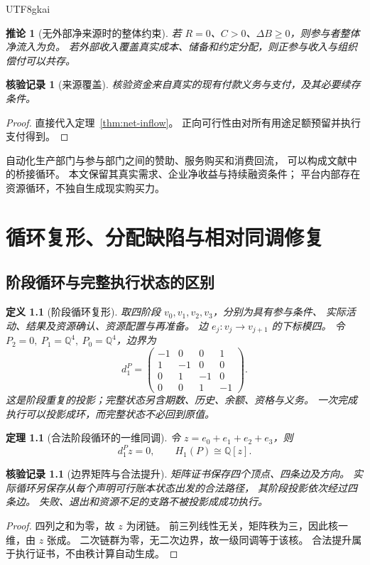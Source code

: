 \documentclass[12pt,a4paper,openany]{report}
\newtheorem{definition}{定义}[chapter]
\newtheorem{theorem}{定理}[chapter]
\newtheorem{corollary}{推论}[chapter]
\newtheorem{Certificate}{核验记录}[chapter]
\newcommand{\QQ}{\mathbb Q}
\begin{document}
\begin{CJK*}{UTF8}{gkai}
\begin{corollary}[无外部净来源时的整体约束]
若 \(R=0\)、\(C>0\)、\(\Delta B\ge0\)，则参与者整体净流入为负。
若外部收入覆盖真实成本、储备和约定分配，则正参与收入与组织偿付可以共存。
\end{corollary}
\begin{Certificate}[来源覆盖]
核验资金来自真实的现有付款义务与支付，及其必要续存条件。
\end{Certificate}
\begin{proof}
直接代入定理~\ref{thm:net-inflow}。
正向可行性由对所有用途足额预留并执行支付得到。
\end{proof}

自动化生产部门与参与部门之间的赞助、服务购买和消费回流，
可以构成文献\cite{EMarket}中的桥接循环。
本文保留其真实需求、企业净收益与持续融资条件；
平台内部存在资源循环，不独自生成现实购买力。

\chapter{循环复形、分配缺陷与相对同调修复}
\label{ch:homology}

\section{阶段循环与完整执行状态的区别}
\begin{definition}[阶段循环复形]
\label{def:phase}
取四阶段 \(v_0,v_1,v_2,v_3\)，分别为具有参与条件、
实际活动、结果及资源确认、资源配置与再准备。
边 \(e_j:v_j\to v_{j+1}\) 的下标模四。
令 \(P_2=0,\ P_1=\QQ^4,\ P_0=\QQ^4\)，边界为
\[
d_1^P=
\begin{pmatrix}
-1&0&0&1\\
1&-1&0&0\\
0&1&-1&0\\
0&0&1&-1
\end{pmatrix}.
\]
这是阶段重复的投影；完整状态另含期数、历史、余额、资格与义务。
一次完成执行可以投影成环，而完整状态不必回到原值。
\end{definition}

\begin{theorem}[合法阶段循环的一维同调]
\label{thm:cycle}
令 \(z=e_0+e_1+e_2+e_3\)，则
\[
d_1^Pz=0,\qquad H_1(P)\cong\QQ[z].
\]
\end{theorem}
\begin{Certificate}[边界矩阵与合法提升]
矩阵证书保存四个顶点、四条边及方向。
实际循环另保存从每个声明可行账本状态出发的合法路径，
其阶段投影依次经过四条边。
失败、退出和资源不足的支路不被投影成成功执行。
\end{Certificate}
\begin{proof}
四列之和为零，故 \(z\) 为闭链。
前三列线性无关，矩阵秩为三，因此核一维，由 \(z\) 张成。
二次链群为零，无二次边界，故一级同调等于该核。
合法提升属于执行证书，不由秩计算自动生成。
\end{proof}


\end{CJK*}
\end{document}
